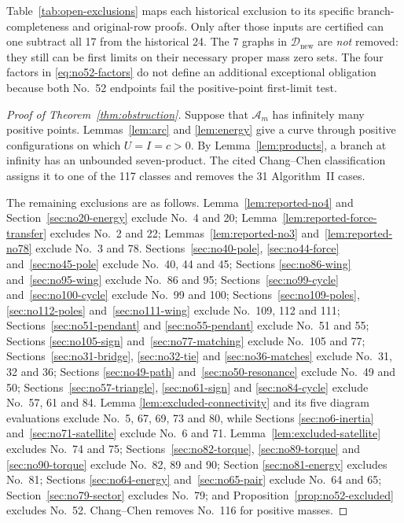 \documentclass[11pt]{amsart}
\theoremstyle{remark}
\newcommand{\A}{\mathcal A}
\newcommand{\D}{\mathcal D}
\begin{document}
Table~\ref{tab:open-exclusions} maps each historical exclusion to its
specific branch-completeness and original-row proofs. Only after those
inputs are certified can one subtract all 17 from the historical 24.
The 7 graphs in $\D_{\mathrm{new}}$ are \emph{not} removed: they still
can be first limits on their necessary proper mass zero sets. The four
factors in \eqref{eq:no52-factors} do not define an additional
exceptional obligation because both No.~52 endpoints fail the
positive-point first-limit test.
\begin{proof}[Proof of Theorem~\ref{thm:obstruction}]
Suppose that $\A_m$ has infinitely many positive points. Lemmas~\ref{lem:arc} and
\ref{lem:energy} give a curve through positive configurations on
which $U=I=c>0$. By Lemma~\ref{lem:products}, a branch at infinity
has an unbounded seven-product. The cited Chang--Chen classification
assigns it to one of the 117 classes and removes the 31 Algorithm~II
cases.

The remaining exclusions are as follows. Lemma~\ref{lem:reported-no4}
and Section~\ref{sec:no20-energy} exclude No.~4 and 20;
Lemma~\ref{lem:reported-force-transfer} excludes No.~2 and 22;
Lemmas~\ref{lem:reported-no3} and~\ref{lem:reported-no78} exclude
No.~3 and 78. Sections~\ref{sec:no40-pole}, \ref{sec:no44-force}
and~\ref{sec:no45-pole} exclude No.~40, 44 and 45; Sections
\ref{sec:no86-wing} and~\ref{sec:no95-wing} exclude No.~86 and 95;
Sections~\ref{sec:no99-cycle} and~\ref{sec:no100-cycle} exclude
No.~99 and 100; Sections~\ref{sec:no109-poles},
\ref{sec:no112-poles} and~\ref{sec:no111-wing} exclude No.~109,
112 and 111; Sections~\ref{sec:no51-pendant} and
\ref{sec:no55-pendant} exclude No.~51 and 55; Sections
\ref{sec:no105-sign} and~\ref{sec:no77-matching} exclude No.~105
and 77; Sections~\ref{sec:no31-bridge}, \ref{sec:no32-tie} and
\ref{sec:no36-matches} exclude No.~31, 32 and 36; Sections
\ref{sec:no49-path} and~\ref{sec:no50-resonance} exclude No.~49
and 50; Sections~\ref{sec:no57-triangle}, \ref{sec:no61-sign} and
\ref{sec:no84-cycle} exclude No.~57, 61 and 84. Lemma
\ref{lem:excluded-connectivity} and its five diagram evaluations
exclude No.~5, 67, 69, 73 and 80, while Sections
\ref{sec:no6-inertia} and~\ref{sec:no71-satellite} exclude No.~6
and 71. Lemma~\ref{lem:excluded-satellite} excludes No.~74 and 75;
Sections~\ref{sec:no82-torque}, \ref{sec:no89-torque} and
\ref{sec:no90-torque} exclude No.~82, 89 and 90; Section
\ref{sec:no81-energy} excludes No.~81; Sections
\ref{sec:no64-energy} and~\ref{sec:no65-pair} exclude No.~64 and
65; Section~\ref{sec:no79-sector} excludes No.~79; and
Proposition~\ref{prop:no52-excluded} excludes No.~52. Chang--Chen
\cite[Table~6.1]{CCII} removes No.~116 for positive masses.


\end{proof}
\end{document}
